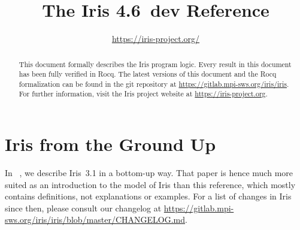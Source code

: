 \documentclass[10pt]{article}
\title{\bfseries The Iris 4.6~dev Reference}
\author{\url{https://iris-project.org/}}
\begin{document}
\maketitle
\thispagestyle{empty}
\vfill
\begin{abstract}
This document formally describes the Iris program logic.
Every result in this document has been fully verified in Rocq.
The latest versions of this document and the Rocq formalization can be found in the git repository at \url{https://gitlab.mpi-sws.org/iris/iris}.
For further information, visit the Iris project website at \url{https://iris-project.org}.
\end{abstract}

\clearpage\begingroup
\tableofcontents
\endgroup

\clearpage\begingroup
\section{Iris from the Ground Up}
In ~\cite{iris-ground-up}, we describe Iris~3.1 in a bottom-up way.
That paper is hence much more suited as an introduction to the model of Iris than this reference, which mostly contains definitions, not explanations or examples.
For a list of changes in Iris since then, please consult our changelog at \url{https://gitlab.mpi-sws.org/iris/iris/blob/master/CHANGELOG.md}.
\endgroup

\clearpage\begingroup

\endgroup
\clearpage\begingroup

\endgroup
\clearpage\begingroup

\endgroup
\clearpage\begingroup

\endgroup
\clearpage\begingroup

\endgroup
\clearpage\begingroup

\endgroup
\clearpage\begingroup

\endgroup
\clearpage\begingroup

\endgroup
\clearpage\begingroup

\endgroup
\clearpage\begingroup

\endgroup
\clearpage\begingroup
\printbibliography
\endgroup
\end{document}

